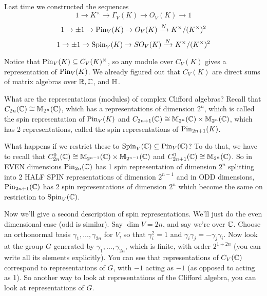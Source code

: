  \setcounter{lecture}{24}

 Last time we constructed the sequences
 \[
    1\to K^\times \to \Gamma_V(K)\to O_V(K)\to 1
 \]
 \[
    1\to \pm 1\to \operatorname{Pin}_V(K)\to O_V(K)\xrightarrow{N} K^\times/(K^\times )^2
 \]
 \[
    1\to \pm 1 \to \operatorname{Spin}_V(K) \to SO_V(K) \xrightarrow{N} K^\times/(K^\times)^2
 \]

  Notice that
 $\operatorname{Pin}_V(K)\subseteq C_V(K)^\times$, so any module over $C_V(K)$ gives a representation of
 $\operatorname{Pin}_V(K)$. We already figured out that $C_V(K)$ are direct sums of matrix algebras
 over $\mathbb{R},\mathbb{C}$, and $\mathbb{H}$.

 What are the representations (modules) of complex Clifford algebras? Recall that
 $C_{2n}(\mathbb{C})\cong \mathbb{M}_{2^n}(\mathbb{C})$, which has a representations of dimension $2^n$,
 which is called the spin representation of $\operatorname{Pin}_V(K)$ and $C_{2n+1}(\mathbb{C})\cong
 \mathbb{M}_{2^n}(\mathbb{C})\times \mathbb{M}_{2^n}(\mathbb{C})$, which has 2 representations, called the spin
 representations of $\operatorname{Pin}_{2n+1}(K)$.

 What happens if we restrict these to $\operatorname{Spin}_V(\mathbb{C})\subseteq \operatorname{Pin}_V(\mathbb{C})$? To do that,
 we have to recall that $C^0_{2n}(\mathbb{C})\cong \mathbb{M}_{2^{n-1}}(\mathbb{C})\times
 \mathbb{M}_{2^{n-1}}(\mathbb{C})$ and $C^0_{2n+1}(\mathbb{C})\cong \mathbb{M}_{2^n}(\mathbb{C})$. So in EVEN dimensions
 $\operatorname{Pin}_{2n}(\mathbb{C})$ has 1 spin representation of dimension $2^n$ splitting into 2 HALF
 SPIN representations of dimension $2^{n-1}$ and in ODD dimensions, $\operatorname{Pin}_{2n+1}(\mathbb{C})$
 has 2 spin representations of dimension $2^n$ which become the same on restriction to
 $\operatorname{Spin}_V(\mathbb{C})$.

 Now we'll give a second description of spin representations. We'll just do the
 even dimensional case (odd is similar). Say $\dim V=2n$, and say we're over $\mathbb{C}$.
 Choose an orthonormal basis $\gamma_1,\dots, \gamma_{2n}$ for $V$, so that
 $\gamma_i^2=1$ and $\gamma_i\gamma_j = -\gamma_j\gamma_i$. Now look at the group $G$
 generated by $\gamma_1,\dots, \gamma_{2n}$, which is finite, with order $2^{1+2n}$
 (you can write all its elements explicitly). You can see that representations of
 $C_V(\mathbb{C})$ correspond to representations of $G$, with $-1$ acting as $-1$ (as opposed
 to acting as 1). So another way to look at representations of the Clifford algebra,
 you can look at representations of $G$.

